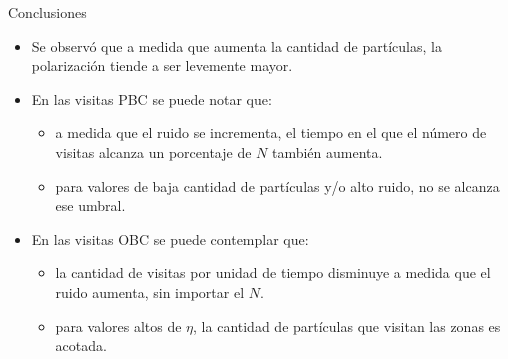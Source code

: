 \documentclass{beamer}
\begin{document}
        \begin{frame}{Conclusiones}
            \begin{itemize}
                \item Se observó que a medida que aumenta la cantidad de partículas, la polarización tiende a ser
                levemente mayor.
                \item En las visitas PBC se puede notar que:
                \begin{itemize}
                    \item a medida que el ruido se incrementa, el tiempo en el que el número de visitas alcanza un
                    porcentaje de $N$ también aumenta.
                    \item para valores de baja cantidad de partículas y/o alto ruido, no se alcanza ese umbral.
                \end{itemize}
                \item En las visitas OBC se puede contemplar que:
                \begin{itemize}
                    \item la cantidad de visitas por unidad de tiempo disminuye a medida que el ruido aumenta, sin importar el $N$.
                    \item para valores altos de $\eta$, la cantidad de partículas que visitan las zonas es acotada.
                \end{itemize}
            \end{itemize}
        \end{frame}
\end{document}
